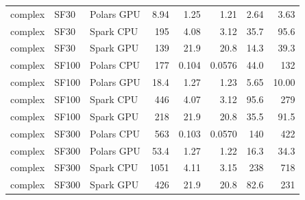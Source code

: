 \begin{longtable}{lllrrrrr}
complex & SF30 & Polars GPU & 8.94 & 1.25 & 1.21 & 2.64 & 3.63 \\
complex & SF30 & Spark CPU & 195 & 4.08 & 3.12 & 35.7 & 95.6 \\
complex & SF30 & Spark GPU & 139 & 21.9 & 20.8 & 14.3 & 39.3 \\
complex & SF100 & Polars CPU & 177 & 0.104 & 0.0576 & 44.0 & 132 \\
complex & SF100 & Polars GPU & 18.4 & 1.27 & 1.23 & 5.65 & 10.00 \\
complex & SF100 & Spark CPU & 446 & 4.07 & 3.12 & 95.6 & 279 \\
complex & SF100 & Spark GPU & 218 & 21.9 & 20.8 & 35.5 & 91.5 \\
complex & SF300 & Polars CPU & 563 & 0.103 & 0.0570 & 140 & 422 \\
complex & SF300 & Polars GPU & 53.4 & 1.27 & 1.22 & 16.3 & 34.3 \\
complex & SF300 & Spark CPU & 1051 & 4.11 & 3.15 & 238 & 718 \\
complex & SF300 & Spark GPU & 426 & 21.9 & 20.8 & 82.6 & 231 \\
\end{longtable}
